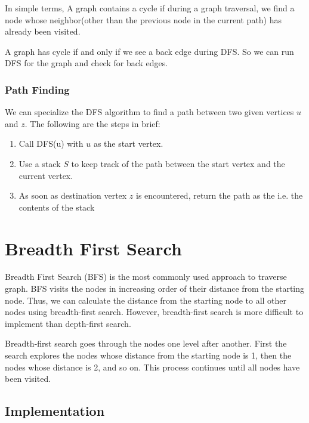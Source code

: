 \documentclass[twoside,12pt,a4paper,english]{book}
\theoremstyle{definition}
\theoremstyle{problemstyle}
\begin{document}

In simple terms, A graph contains a cycle if during a graph traversal, we find a node whose neighbor(other than the previous node in the current path) has already been visited.

A graph has cycle if and only if we see a back edge during DFS. So we can run DFS for the graph and check for back edges.

\subsection{Path Finding}
We can specialize the DFS algorithm to find a path between two given vertices $u$ and $z$. The following are the steps in brief:

\begin{enumerate}
    \item Call DFS(u) with $u$ as the start vertex.
    \item Use a stack $S$ to keep track of the path between the start vertex and the current vertex.
    \item As soon as destination vertex $z$ is encountered, return the path as the i.e. the contents of the stack
\end{enumerate}


\chapter{Breadth First Search}

Breadth First Search (BFS) is the most commonly used approach to traverse graph. BFS visits the nodes in increasing order of their distance
from the starting node. Thus, we can calculate the distance from the starting
node to all other nodes using breadth-first search. However, breadth-first search is more difficult to implement than depth-first search.

Breadth-first search goes through the nodes one level after another. First the
search explores the nodes whose distance from the starting node is 1, then the
nodes whose distance is 2, and so on. This process continues until all nodes have been visited.

\section{Implementation}
\end{document}

